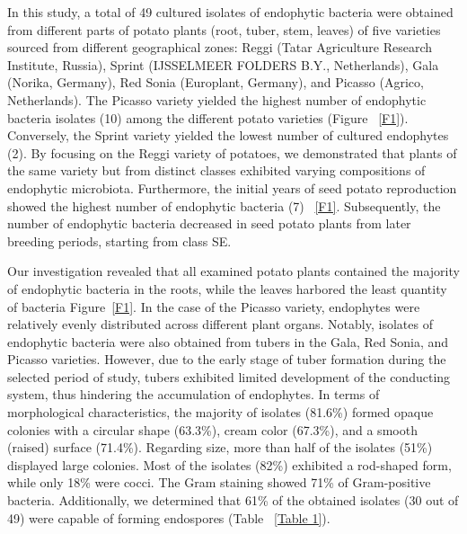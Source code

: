 \documentclass[sn-mathphys,Numbered]{sn-jnl}%
\theoremstyle{thmstyleone}%
\theoremstyle{thmstyletwo}%
\theoremstyle{thmstylethree}%
\begin{document}
In this study, a total of 49 cultured isolates of endophytic bacteria were obtained from different parts of potato plants (root, tuber, stem, leaves) of five varieties sourced from different geographical zones: Reggi (Tatar Agriculture Research Institute, Russia), Sprint (IJSSELMEER FOLDERS B.Y., Netherlands), Gala (Norika, Germany), Red Sonia (Europlant, Germany), and Picasso (Agrico, Netherlands). The Picasso variety yielded the highest number of endophytic bacteria isolates (10) among the different potato varieties (Figure ~\ref{F1}). Conversely, the Sprint variety yielded the lowest number of cultured endophytes (2).
By focusing on the Reggi variety of potatoes, we demonstrated that plants of the same variety but from distinct classes exhibited varying compositions of endophytic microbiota. Furthermore, the initial years of seed potato reproduction showed the highest number of endophytic bacteria (7) ~\ref{F1}. Subsequently, the number of endophytic bacteria decreased in seed potato plants from later breeding periods, starting from class SE.





Our investigation revealed that all examined potato plants contained the majority of endophytic bacteria in the roots, while the leaves harbored the least quantity of bacteria Figure~\ref{F1}. In the case of the Picasso variety, endophytes were relatively evenly distributed across different plant organs. Notably, isolates of endophytic bacteria were also obtained from tubers in the Gala, Red Sonia, and Picasso varieties. However, due to the early stage of tuber formation during the selected period of study, tubers exhibited limited development of the conducting system, thus hindering the accumulation of endophytes.
In terms of morphological characteristics, the majority of isolates (81.6\%) formed opaque colonies with a circular shape (63.3\%), cream color (67.3\%), and a smooth (raised) surface (71.4\%). Regarding size, more than half of the isolates (51\%) displayed large colonies. Most of the isolates (82\%) exhibited a rod-shaped form, while only 18\% were cocci. The Gram staining showed 71\% of Gram-positive bacteria. Additionally, we determined that 61\% of the obtained isolates (30 out of 49) were capable of forming endospores (Table ~\ref{Table 1}).
\end{document}
